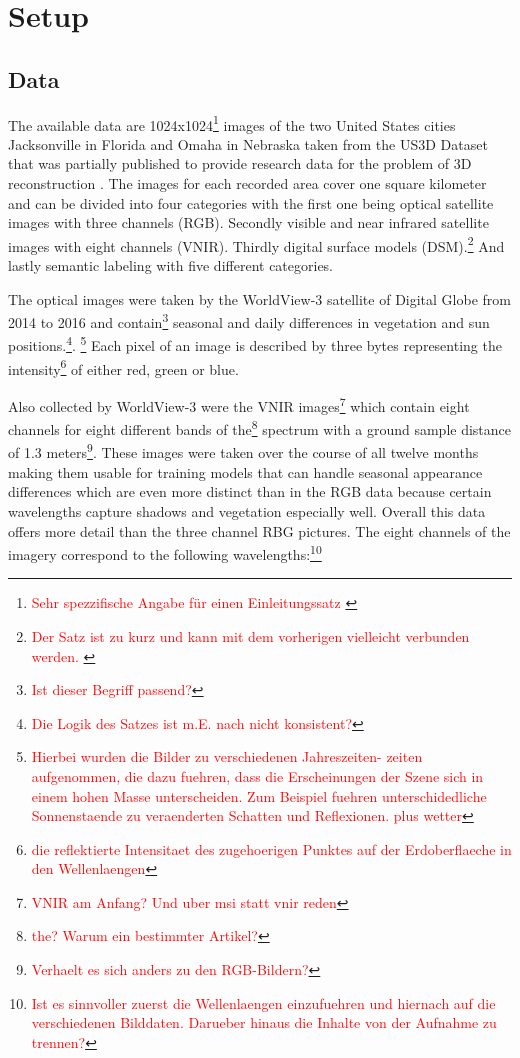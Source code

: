 \section{Setup}

\subsection{Data}

The available data are 1024x1024\footnote{\textcolor{red}{Sehr spezzifische Angabe für einen Einleitungssatz }} images of the two United States cities Jacksonville
in Florida and Omaha in Nebraska taken from the US3D Dataset that
was partially published to provide research data for the problem
of 3D reconstruction \parencite{2019-bosch-semantic}.
The images for each recorded area cover one square kilometer and can be divided 
into four categories with the first one being optical satellite images with three channels (RGB). 
Secondly visible and near infrared satellite images with eight channels (VNIR). 
Thirdly digital surface models (DSM).\footnote{\textcolor{red}{Der Satz ist zu kurz und kann mit dem vorherigen vielleicht verbunden werden. }} And lastly semantic labeling with five different categories.
\medskip

The optical images were taken by the WorldView-3 satellite of Digital Globe from 2014 to 2016
and contain\footnote{\textcolor{red}{Ist dieser Begriff passend?}} seasonal and daily differences in vegetation and sun positions.\footnote{\textcolor{red}{Die Logik des Satzes ist m.E. nach nicht konsistent?}}. \footnote{\textcolor{red}{Hierbei wurden die Bilder zu verschiedenen Jahreszeiten- zeiten aufgenommen, die dazu fuehren, dass die Erscheinungen der Szene sich in einem hohen Masse unterscheiden. Zum Beispiel fuehren unterschidedliche Sonnenstaende zu veraenderten Schatten und Reflexionen. plus wetter}} 
Each pixel of an image is described by three bytes representing the intensity\footnote{\textcolor{red}{die reflektierte Intensitaet des zugehoerigen Punktes auf der Erdoberflaeche in den Wellenlaengen}}  of either red, green or blue.

Also collected by WorldView-3 were the VNIR images\footnote{\textcolor{red}{VNIR am Anfang? Und uber msi statt vnir reden}} which contain eight channels for eight different bands of the\footnote{\textcolor{red}{the? Warum ein bestimmter Artikel?}}  spectrum with a ground sample distance of 1.3 meters\footnote{\textcolor{red}{Verhaelt es sich anders zu den RGB-Bildern?}}. These images were taken over the course of all twelve months making them usable for training models that can handle seasonal appearance differences which are even more distinct than in the RGB data because certain wavelengths capture shadows and vegetation especially well. Overall this data offers more detail than the three channel RBG pictures. The eight channels of the imagery correspond to the following wavelengths:\footnote{\textcolor{red}{Ist es sinnvoller zuerst die Wellenlaengen einzufuehren und hiernach auf die verschiedenen Bilddaten. Darueber hinaus die Inhalte von der Aufnahme zu trennen?}}

